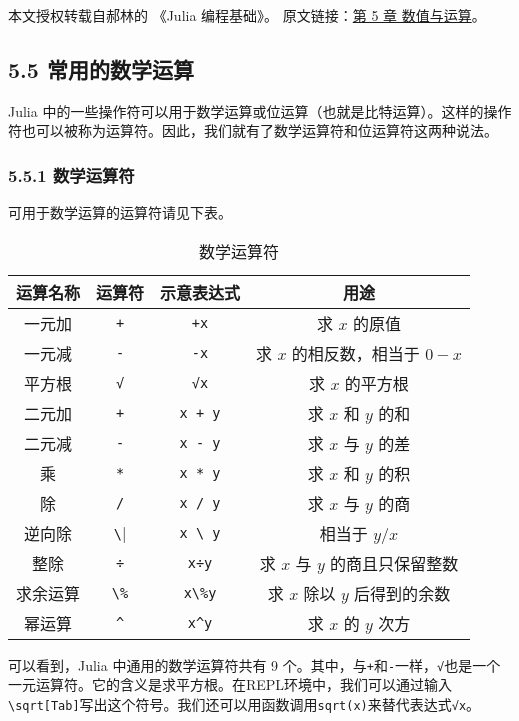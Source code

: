
本文授权转载自郝林的 《Julia 编程基础》。 原文链接：\href{https://github.com/hyper0x/JuliaBasics/blob/master/book/ch05.md}{第 5 章 数值与运算}。


\subsection{5.5 常用的数学运算}

Julia 中的一些操作符可以用于数学运算或位运算（也就是比特运算）。这样的操作符也可以被称为运算符。因此，我们就有了数学运算符和位运算符这两种说法。

\subsubsection{5.5.1 数学运算符}

可用于数学运算的运算符请见下表。
\begin{table}[ht]
\centering
\caption{数学运算符}\label{tab_JuC5S5_1}
\begin{tabular}{|c|c|c|c|}
\hline
运算名称 & 运算符 & 示意表达式 & 用途 \\
\hline
一元加 & \verb|+| & \verb|+x| & 求 $x$ 的原值 \\
\hline
一元减 & \verb|-| & \verb|-x| & 求 $x$ 的相反数，相当于 $0-x$ \\
\hline
平方根 & \verb|√|  & \verb|√x| & 求 $x$ 的平方根 \\
\hline
二元加 & \verb|+| & \verb|x + y| & 求 $x$ 和 $y$ 的和 \\
\hline
二元减 & \verb|-| & \verb|x - y| & 求 $x$ 与 $y$ 的差 \\
\hline
乘 & \verb|*| & \verb|x * y| & 求 $x$ 和 $y$ 的积 \\
\hline
除 & \verb|/| & \verb|x / y| & 求 $x$ 与 $y$ 的商 \\
\hline
逆向除 & \verb|\| & \verb|x \ y| & 相当于 $y / x$ \\
\hline
整除 & \verb|÷| & \verb|x÷y| & 求 $x$ 与 $y$ 的商且只保留整数 \\
\hline
求余运算 & \verb|\%| & \verb|x\%y| & 求 $x$ 除以 $y$ 后得到的余数 \\
\hline
幂运算 & \verb|^| & \verb|x^y| & 求 $x$ 的 $y$ 次方 \\
\hline
\end{tabular}
\end{table}

可以看到，Julia 中通用的数学运算符共有 9 个。其中，与\verb|+|和\verb|-|一样，\verb|√|也是一个一元运算符。它的含义是求平方根。在REPL环境中，我们可以通过输入\verb|\sqrt[Tab]|写出这个符号。我们还可以用函数调用\verb|sqrt(x)|来替代表达式\verb|√x|。


